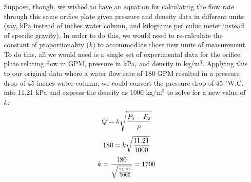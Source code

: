 \documentclass{beamer}
\begin{document}
\begin{frame}
	\frametitle{}

	



Suppose, though, we wished to have an equation for calculating the flow rate through this same orifice plate given pressure and density data in different units (say, kPa instead of inches water column, and kilograms per cubic meter instead of specific gravity).  In order to do this, we would need to re-calculate the constant of proportionality ($k$) to accommodate those new units of measurement.  To do this, all we would need is a single set of experimental data for the orifice plate relating flow in GPM, pressure in kPa, and density in kg/m$^{3}$.
%
Applying this to our original data where a water flow rate of 180 GPM resulted in a pressure drop of 45 inches water column, we could convert the pressure drop of 45 "W.C. into 11.21 kPa and express the density as 1000 kg/m$^{3}$ to solve for a new value of $k$:
%
$$Q = k \sqrt{{P_1 - P_2} \over \rho}$$
%
$$180 = k \sqrt{{11.21} \over 1000}$$
%
$$k = {180 \over \sqrt{11.21 \over 1000}} = 1700$$
%
\end{frame}
%
%
%
%
%
%
%
%
%
%
%
\end{document}
